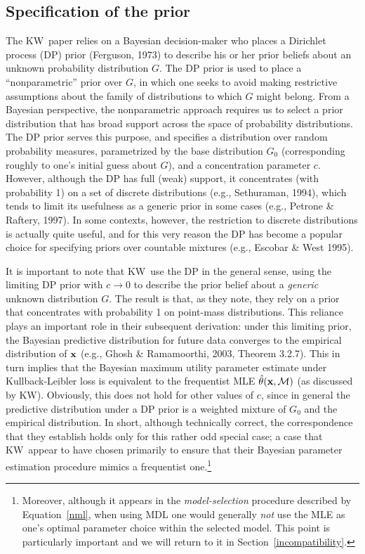 \documentclass[authoryear]{elsarticle}
\newcommand{\model}{\mathcal{M}}
\newcommand{\kw}{KW}
\newcommand{\vx}{\ensuremath{{\bf x}}}
\begin{document}
\subsection{Specification of the prior}

The \kw\ paper relies on a Bayesian decision-maker who places a Dirichlet
process (DP) prior (Ferguson, 1973) to describe his or her prior beliefs
about an unknown
probability distribution $G$. The DP prior is used to place a
``nonparametric'' prior over $G$, in which one seeks to avoid
making restrictive assumptions about the family of distributions
to which $G$ might belong. From a Bayesian perspective, the
nonparametric approach requires us to select a prior distribution that
has broad support across the space of probability distributions. The
DP prior serves this purpose, and specifies a distribution over random
probability measures, parametrized by the base distribution $G_0$
(corresponding roughly to one's initial guess about $G$), and a
concentration parameter $c$. However, although the DP has full
(weak) support, it concentrates (with probability 1) on a set of
discrete distributions (e.g., Sethuraman, 1994), which tends to
limit its usefulness as a generic prior in some cases
(e.g., Petrone \& Raftery, 1997).
In some contexts, however, the restriction to discrete distributions
is actually quite useful, and for this very reason the DP has become a
popular choice for specifying priors over countable
mixtures (e.g., Escobar \& West 1995).

It is important to note that \kw\ use the DP in the general sense,
using the limiting DP prior with $c \rightarrow 0$ to describe the
prior belief about a {\it generic} unknown distribution $G$.  The
result is that, as they note, they rely on a prior that concentrates
with probability 1 on point-mass distributions.  This reliance plays
an important role in their subsequent derivation: under this limiting
prior, the Bayesian predictive distribution for future data converges
to the empirical distribution of $\vx$ (e.g., Ghosh \& Ramamoorthi,
2003, Theorem 3.2.7). This in turn implies that the Bayesian maximum
utility parameter estimate under Kullback-Leibler loss is equivalent
to the frequentist MLE $\hat{\theta}(\vx,\model)$ (as discussed by
\kw).  Obviously, this does not hold for other values of $c$, since in
general the predictive distribution under a DP prior is a weighted
mixture of $G_0$ and the empirical distribution.  In short, although
technically correct, the correspondence that they establish holds only
for this rather odd special case; a case that \kw\ appear to have
chosen primarily to ensure that their Bayesian parameter estimation
procedure mimics a frequentist one.\footnote{Moreover, although it appears in
the {\em model-selection} procedure described by Equation~\ref{nml},
when using MDL one would generally {\em not\/} use the MLE as one's
optimal parameter choice within the selected model. This point is
particularly important and we will return to it in Section~\ref{incompatibility}.}
\end{document}
